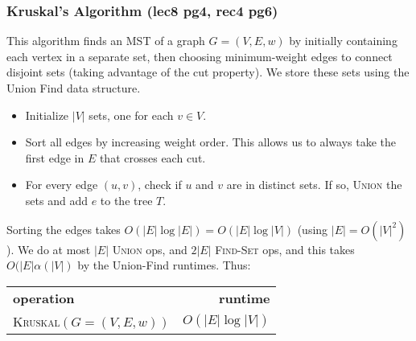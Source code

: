 \documentclass{article}
\begin{document}
\begin{multicols}{2}
	\subsubsection{Kruskal's Algorithm (lec8 pg4, rec4 pg6)}
	This algorithm finds an MST of a graph $G=(V,E,w)$ by initially containing each vertex in a separate set, then choosing minimum-weight edges to connect disjoint sets (taking advantage of the cut property). We store these sets using the Union Find data structure.  

	\begin{itemize}[noitemsep, topsep=0pt]
		\item Initialize $|V|$ sets, one for each $v \in V$.
		\item Sort all edges by increasing weight order. This allows us to always take the first edge in $E$ that crosses each cut.
		\item For every edge $(u,v)$, check if $u$ and $v$ are in distinct sets. If so, \textsc{Union} the sets and add $e$ to the tree $T$. 
	\end{itemize}
	Sorting the edges takes $O(|E|\log|E|) = O(|E|\log|V|)$ (using $|E| = O(|V|^2)$). We do at most $|E|$ \textsc{Union} ops, and $2|E|$ \textsc{Find-Set} ops, and this takes $O(|E|\alpha(|V|)$ by the Union-Find runtimes. Thus:
	\begin{center}
		\begin{tabular}{lr}
			\textbf{operation} & \textbf{runtime} \\
			\textsc{Kruskal}$(G=(V, E, w))$ & $O(|E|\log |V|)$ \\
		\end{tabular}
	\end{center}


\end{multicols}
\end{document}
